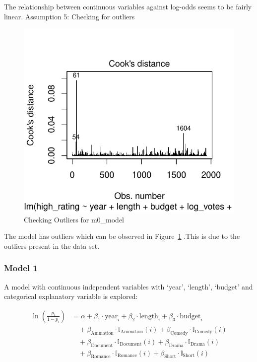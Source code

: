 \documentclass[
  letterpaper,
  DIV=11,
  numbers=noendperiod]{scrartcl}
\begin{document}
The relationship between continuous variables against log-odds seems to
be fairly linear. \clearpage Assumption 5: Checking for outliers

\begin{figure}

{\centering \includegraphics{Group_06_Analysis_files/figure-pdf/fig-cook-m0-1.pdf}

}

\caption{\label{fig-cook-m0}Checking Outliers for m0\_model}

\end{figure}

The model has outliers which can be observed in Figure~\ref{fig-cook-m0}
.This is due to the outliers present in the data set.

\hypertarget{sec-m1.model}{%
\subsubsection{Model 1}\label{sec-m1.model}}

A model with continuous independent variables with `year', `length',
`budget' and categorical explanatory variable is explored:

\[\begin{aligned}\ln\left(\frac{p_i}{1-p_i}\right) &= \alpha + \beta_1 \cdot \textrm{year}_i + \beta_2 \cdot \textrm{length}_i + \beta_3 \cdot \textrm{budget}_i \\&\quad + \beta_{\textrm{Animation}} \cdot \mathbb{I}_{\textrm{Animation}}(i) + \beta_{\textrm{Comedy}} \cdot \mathbb{I}_{\textrm{Comedy}}(i) \\&\quad + \beta_{\textrm{Document}} \cdot \mathbb{I}_{\textrm{Document}}(i) + \beta_{\textrm{Drama}} \cdot \mathbb{I}_{\textrm{Drama}}(i) \\&\quad + \beta_{\textrm{Romance}} \cdot \mathbb{I}_{\textrm{Romance}}(i) + \beta_{\textrm{Short}} \cdot \mathbb{I}_{\textrm{Short}}(i)\end{aligned}\]
\end{document}
